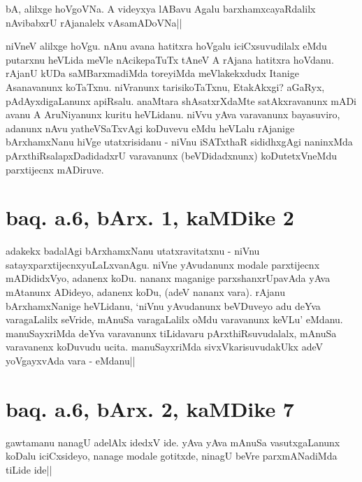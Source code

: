 \begin{artha}
bA, alilxge hoVgoVNa. A videyxya lABavu Agalu barxhamxcayaRdalilx 
nAvibabxrU rAjanalelx vAsamADoVNa||
\end{artha}


\begin{artha}
niVneV alilxge hoVgu. nAnu avana hatitxra hoVgalu iciCxsuvudilalx eMdu 
putarxnu heVLida meVle nAcikepaTuTx tAneV A rAjana hatitxra hoVdanu. 
rAjanU kUDa saMBarxmadiMda toreyiMda meVlakekxdudx Itanige Asanavanunx 
koTaTxnu. niVranunx tarisikoTaTxnu, EtakAkxgi? aGaRyx, 
pAdAyxdigaLanunx apiRsalu. anaMtara shAsatxrXdaMte satAkxravanunx mADi 
avanu A AruNiyanunx kuritu heVLidanu. niVvu yAva varavanunx 
bayasuviro, adanunx nAvu yatheVSaTxvAgi koDuvevu eMdu heVLalu rAjanige 
bArxhamxNanu hiVge utatxrisidanu - niVnu iSATxthaR sididhxgAgi 
naninxMda pArxthiRsalapxDadidadxrU varavanunx (beVDidadxnunx) 
koDutetxVneMdu parxtijecnx mADiruve.
\end{artha}

\section*{baq. a.6, bArx. 1, kaMDike 2}

\stext

\stext

\begin{artha}
adakekx badalAgi bArxhamxNanu utatxravitatxnu - niVnu 
satayxparxtijecnxyuLaLxvanAgu. niVne yAvudanunx modale parxtijecnx 
mADididxVyo, adanenx koDu. nananx maganige parxshanxrUpavAda yAva 
mAtanunx ADideyo, adanenx koDu, (adeV nananx vara). rAjanu 
bArxhamxNanige heVLidanu, `niVnu yAvudanunx beVDuveyo adu deYva 
varagaLalilx seVride, mAnuSa varagaLalilx oMdu varavanunx keVLu' 
eMdanu. manuSayxriMda deYva varavanunx tiLidavaru pArxthiRsuvudalalx, 
mAnuSa varavanenx koDuvudu ucita. manuSayxriMda sivxVkarisuvudakUkx 
adeV yoVgayxvAda vara - eMdanu|| 
\end{artha}

\section*{baq. a.6, bArx. 2, kaMDike 7}

\stext

\begin{artha}
gawtamanu nanagU adelAlx idedxV ide. yAva yAva mAnuSa vasutxgaLanunx 
koDalu iciCxsideyo, nanage modale gotitxde, ninagU beVre parxmANadiMda 
tiLide ide||
\end{artha}

